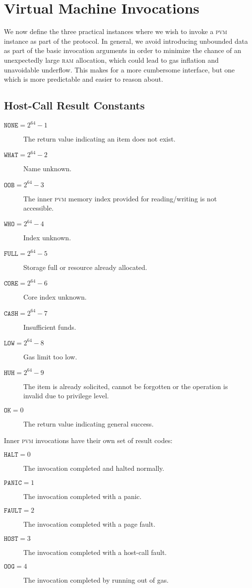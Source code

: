 \section{Virtual Machine Invocations}\label{sec:virtualmachineinvocations}

We now define the three practical instances where we wish to invoke a \textsc{pvm} instance as part of the protocol. In general, we avoid introducing unbounded data as part of the basic invocation arguments in order to minimize the chance of an unexpectedly large \textsc{ram} allocation, which could lead to gas inflation and unavoidable underflow. This makes for a more cumbersome interface, but one which is more predictable and easier to reason about.


\subsection{Host-Call Result Constants}

\begin{description}
  \item[$\mathtt{NONE} = 2^{64} - 1$] The return value indicating an item does not exist.
  \item[$\mathtt{WHAT} = 2^{64} - 2$] Name unknown.
  \item[$\mathtt{OOB} = 2^{64} - 3$] The inner \textsc{pvm} memory index provided for reading/writing is not accessible.
  \item[$\mathtt{WHO} = 2^{64} - 4$] Index unknown.
  \item[$\mathtt{FULL} = 2^{64} - 5$] Storage full or resource already allocated.
  \item[$\mathtt{CORE} = 2^{64} - 6$] Core index unknown.
  \item[$\mathtt{CASH} = 2^{64} - 7$] Insufficient funds.
  \item[$\mathtt{LOW} = 2^{64} - 8$] Gas limit too low.
  \item[$\mathtt{HUH} = 2^{64} - 9$] The item is already solicited, cannot be forgotten or the operation is invalid due to privilege level.
  \item[$\mathtt{OK} = 0$] The return value indicating general success.
\end{description}

Inner \textsc{pvm} invocations have their own set of result codes:
\begin{description}
  \item[$\mathtt{HALT} = 0$] The invocation completed and halted normally.
  \item[$\mathtt{PANIC} = 1$] The invocation completed with a panic.
  \item[$\mathtt{FAULT} = 2$] The invocation completed with a page fault.
  \item[$\mathtt{HOST} = 3$] The invocation completed with a host-call fault.
  \item[$\mathtt{OOG} = 4$] The invocation completed by running out of gas.
\end{description}

